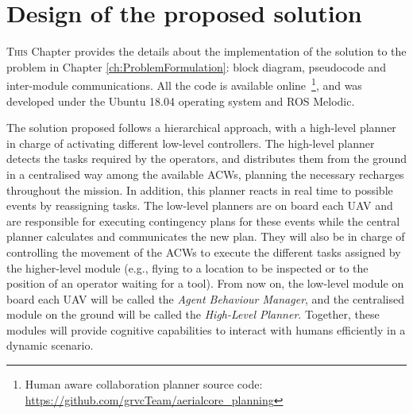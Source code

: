 \chapter{Design of the proposed solution}
\label{ch:DesignOfTheProposedSolution}
\lettrine[lraise=-0.1, lines=2, loversize=0.2]{T}{his} Chapter provides the details about the implementation of the solution to the problem in Chapter \ref{ch:ProblemFormulation}: block diagram, pseudocode and inter-module communications. All the code is available online~\footnote{Human aware collaboration planner source code: \url{https://github.com/grvcTeam/aerialcore_planning}}, and was developed under the Ubuntu 18.04 operating system and ROS Melodic.

The solution proposed follows a hierarchical approach, with a high-level planner in charge of activating different low-level controllers. The high-level planner detects the tasks required by the operators, and distributes them from the ground in a centralised way among the available \glspl{ACW}, planning the necessary recharges throughout the mission. In addition, this planner reacts in real time to possible events by reassigning tasks. The low-level planners are on board each \gls{UAV} and are responsible for executing contingency plans for these events while the central planner calculates and communicates the new plan. They will also be in charge of controlling the movement of the \glspl{ACW} to execute the different tasks assigned by the higher-level module (e.g., flying to a location to be inspected or to the position of an operator waiting for a tool). From now on, the low-level module on board each \gls{UAV} will be called the \emph{Agent Behaviour Manager}, and the centralised module on the ground will be called the \emph{High-Level Planner}. Together, these modules will provide cognitive capabilities to interact with humans efficiently in a dynamic scenario. 


